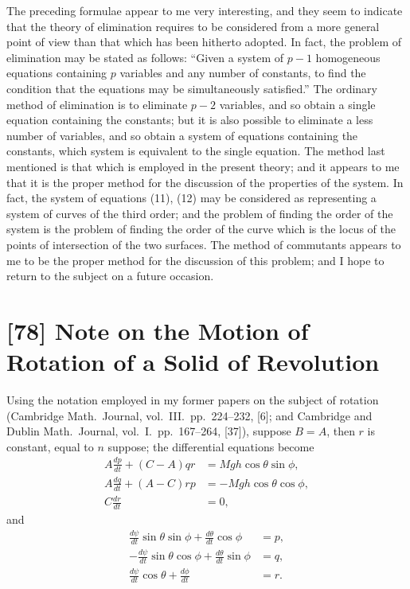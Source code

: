 \documentclass[12pt,a4paper]{article}
\begin{document}
The preceding formulae appear to me very interesting, and they seem to indicate that the theory of elimination requires to be considered from a more general point of view than that which has been hitherto adopted. In fact, the problem of elimination may be stated as follows: ``Given a system of $p - 1$ homogeneous equations containing $p$ variables and any number of constants, to find the condition that the equations may be simultaneously satisfied.'' The ordinary method of elimination is to eliminate $p - 2$ variables, and so obtain a single equation containing the constants; but it is also possible to eliminate a less number of variables, and so obtain a system of equations containing the constants, which system is equivalent to the single equation. The method last mentioned is that which is employed in the present theory; and it appears to me that it is the proper method for the discussion of the properties of the system. In fact, the system of equations (11), (12) may be considered as representing a system of curves of the third order; and the problem of finding the order of the system is the problem of finding the order of the curve which is the locus of the points of intersection of the two surfaces. The method of commutants appears to me to be the proper method for the discussion of this problem; and I hope to return to the subject on a future occasion.


\newpage
\section*{[78] Note on the Motion of Rotation of a Solid of Revolution}

\bigskip

Using the notation employed in my former papers on the subject of rotation (Cambridge Math.\ Journal, vol.~III.\ pp.~224--232, [6]; and Cambridge and Dublin Math.\ Journal, vol.~I.\ pp.~167--264, [37]), suppose $B = A$, then $r$ is constant, equal to $n$ suppose; the differential equations become
\begin{align}
A\frac{dp}{dt} + (C - A)qr &= Mgh\cos\theta\sin\phi, \tag{1} \\
A\frac{dq}{dt} + (A - C)rp &= -Mgh\cos\theta\cos\phi, \tag{2} \\
C\frac{dr}{dt} &= 0, \tag{3}
\end{align}
and
\begin{align}
\frac{d\psi}{dt}\sin\theta\sin\phi + \frac{d\theta}{dt}\cos\phi &= p, \tag{4} \\
-\frac{d\psi}{dt}\sin\theta\cos\phi + \frac{d\theta}{dt}\sin\phi &= q, \tag{5} \\
\frac{d\psi}{dt}\cos\theta + \frac{d\phi}{dt} &= r. \tag{6}
\end{align}
\end{document}
